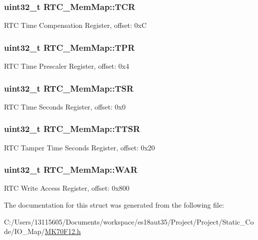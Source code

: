 \subsubsection[{T\+C\+R}]{\setlength{\rightskip}{0pt plus 5cm}uint32\+\_\+t R\+T\+C\+\_\+\+Mem\+Map\+::\+T\+C\+R}\label{struct_r_t_c___mem_map_ab816b0540497796070202cd2f5bc10ed}
R\+T\+C Time Compensation Register, offset\+: 0x\+C \hypertarget{struct_r_t_c___mem_map_a32641b62d548255bdf2164b457a2aaeb}{}
\subsubsection[{T\+P\+R}]{\setlength{\rightskip}{0pt plus 5cm}uint32\+\_\+t R\+T\+C\+\_\+\+Mem\+Map\+::\+T\+P\+R}\label{struct_r_t_c___mem_map_a32641b62d548255bdf2164b457a2aaeb}
R\+T\+C Time Prescaler Register, offset\+: 0x4 \hypertarget{struct_r_t_c___mem_map_a4ca4d2878d99736cbff0e8b107a275f2}{}
\subsubsection[{T\+S\+R}]{\setlength{\rightskip}{0pt plus 5cm}uint32\+\_\+t R\+T\+C\+\_\+\+Mem\+Map\+::\+T\+S\+R}\label{struct_r_t_c___mem_map_a4ca4d2878d99736cbff0e8b107a275f2}
R\+T\+C Time Seconds Register, offset\+: 0x0 \hypertarget{struct_r_t_c___mem_map_a15cd6b1d2a7664e4280746a810d2583f}{}
\subsubsection[{T\+T\+S\+R}]{\setlength{\rightskip}{0pt plus 5cm}uint32\+\_\+t R\+T\+C\+\_\+\+Mem\+Map\+::\+T\+T\+S\+R}\label{struct_r_t_c___mem_map_a15cd6b1d2a7664e4280746a810d2583f}
R\+T\+C Tamper Time Seconds Register, offset\+: 0x20 \hypertarget{struct_r_t_c___mem_map_aa3d2abe1fdd440a05339c38d377a2ee6}{}
\subsubsection[{W\+A\+R}]{\setlength{\rightskip}{0pt plus 5cm}uint32\+\_\+t R\+T\+C\+\_\+\+Mem\+Map\+::\+W\+A\+R}\label{struct_r_t_c___mem_map_aa3d2abe1fdd440a05339c38d377a2ee6}
R\+T\+C Write Access Register, offset\+: 0x800 

The documentation for this struct was generated from the following file\+:\begin{DoxyCompactItemize}
\item 
C\+:/\+Users/13115605/\+Documents/workspace/es18aut35/\+Project/\+Project/\+Static\+\_\+\+Code/\+I\+O\+\_\+\+Map/\hyperlink{_m_k70_f12_8h}{M\+K70\+F12.\+h}\end{DoxyCompactItemize}
